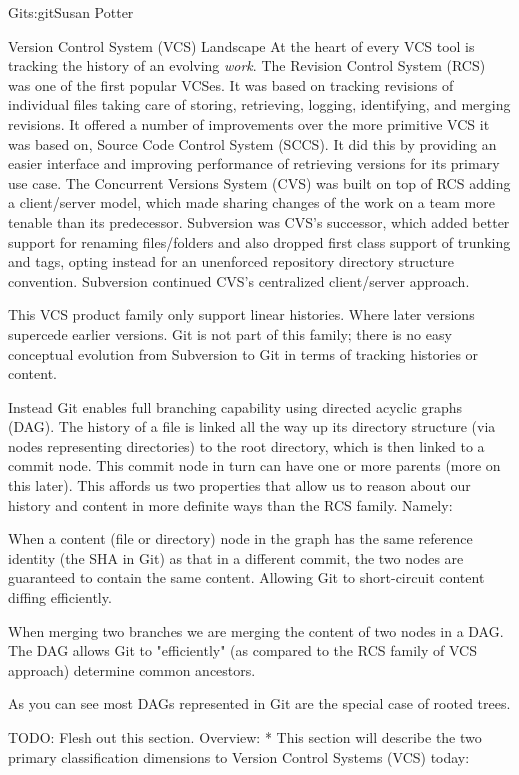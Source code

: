 \begin{aosachapter}{Git}{s:git}{Susan Potter}
\begin{aosasect1}{Version Control System (VCS) Landscape}
At the heart of every VCS tool is tracking the history of an evolving
\emph{work}. The Revision Control System (RCS) was one of the first popular
VCSes. It was based on tracking revisions of individual files taking care of
storing, retrieving, logging, identifying, and merging revisions. It offered
a number of improvements over the more primitive VCS it was based on,
Source Code Control System (SCCS). It did this by providing an easier
interface and improving performance of retrieving versions for its primary
use case. The Concurrent Versions System (CVS) was built on top of RCS adding
a client/server model, which made sharing changes of the work on a team more
tenable than its predecessor. Subversion was CVS's successor, which added
better support for renaming files/folders and also dropped first class
support of trunking and tags, opting instead for an unenforced repository
directory structure convention. Subversion continued CVS's centralized
client/server approach.

This VCS product family only support linear histories. Where later
versions supercede earlier versions. Git is not part of this family; there is
no easy conceptual evolution from Subversion to Git in terms of tracking
histories or content.

Instead Git enables full branching capability using directed acyclic
graphs (DAG). The history of a file is linked all the way
up its directory structure (via nodes representing directories) to the root
directory, which is then linked to a commit node. This commit node in turn
can have one or more parents (more on this later). This affords us two
properties that allow us to reason about our history and content in
more definite ways than the RCS family. Namely:
\begin{aosaitemize}
  \item When a content (file or directory) node in the graph has the same
  reference identity (the SHA in Git) as that in a different commit, the two
  nodes are guaranteed to contain the same content. Allowing Git to
  short-circuit content diffing efficiently.
  \item When merging two branches we are merging the content of two nodes
  in a DAG. The DAG allows Git to "efficiently" (as compared to the
  RCS family of VCS approach) determine common ancestors.
\end{aosaitemize}

As you can see most DAGs represented in Git are the special case of rooted
trees.

TODO: Flesh out this section. Overview:
* This section will describe the two primary classification dimensions to
Version Control Systems (VCS) today:


\end{aosasect1}
\end{aosachapter}

